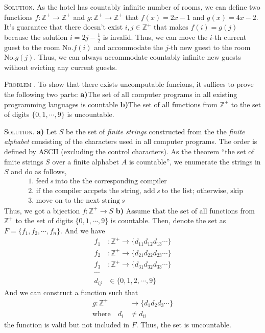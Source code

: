 \documentclass[12pt, a4paper, oneside]{article}
\newcounter{problemname}
\newenvironment{problem}{\stepcounter{problemname}\par\noindent\textsc{Problem \arabic{problemname}. }}{\\\par}
\newenvironment{solution}{\par\noindent\textsc{Solution. }}{\\\par}
\begin{document}
\begin{solution}
    As the hotel has countably infinite number of rooms, we can define two functions $f:\mathbb{Z^+}\rightarrow\mathbb{Z^+}$ and $g:\mathbb{Z^+}\rightarrow\mathbb{Z^+}$ that $f(x) = 2x-1$ and $g(x) = 4x-2$. It's guarantee that there doesn't exist $i,j\in \mathbb{Z^+}$ that makes $f(i)=g(j)$ because the solution $i = 2j - \frac{1}{2}$ is invalid. Thus, we can move the $i$-th current guest to the room No.$f(i)$ and accommodate the $j$-th new guest to the room No.$g(j)$. Thus, we can always accommodate countably infinite new guests without evicting any current guests.
\end{solution}

\begin{problem}
    To show that there exists uncomputable funcions, it suffices to prove the following two parts: \textbf{a)}The set of all computer programs in all existing programming languages is countable \textbf{b)}The set of all functions from $\mathbb{Z}^+$ to the set of digits $\{0,1,\cdots,9\}$ is uncountable.
\end{problem}

\begin{solution}
    \textbf{a)} Let $S$ be the set of \textit{finite strings} constructed from the the \textit{finite alphabet} consisting of the characters used in all computer programs. The order is defined by ASCII (excluding the control characters). As the theorem ``the set of finite strings $S$ over a finite alphabet $A$ is countable'', we enumerate the strings in $S$ and do as follows,
    \begin{align*}
        &\text{1. feed}\ s\ \text{into the the corresponding compiler} \\
        &\text{2. if the compiler accpets the string, add}\ s\ \text{to the list; otherwise, skip} \\
        &\text{3. move on to the next string}\ s
    \end{align*}
    Thus, we got a bijection $f:\mathbb{Z^+}\rightarrow S$
    \newline\textbf{b)} Assume that the set of all functions from $\mathbb{Z}^+$ to the set of digits $\{0,1,\cdots,9\}$ is countable. Then, denote the set as $F=\{f_1,f_2,\cdots,f_n\}$. And we have
    \begin{align*}
        f_1&:\mathbb{Z^+}\rightarrow \{d_{11}d_{12}d_{13}\cdots\} \\
        f_2&:\mathbb{Z^+}\rightarrow \{d_{21}d_{22}d_{23}\cdots\} \\
        f_3&:\mathbb{Z^+}\rightarrow \{d_{31}d_{32}d_{33}\cdots\} \\
        \cdots \\
        d_{ij} &\in \{0,1,2,\cdots,9\}
    \end{align*}
    And we can construct a function such that
    \begin{align*}
        g:\mathbb{Z^+}&\rightarrow \{d_1d_2d_3\cdots\} \\
        \text{where}\quad d_i &\neq d_{ii}
    \end{align*}
    the function is valid but not included in $F$. Thus, the set is uncountable.
\end{solution}
\end{document}
